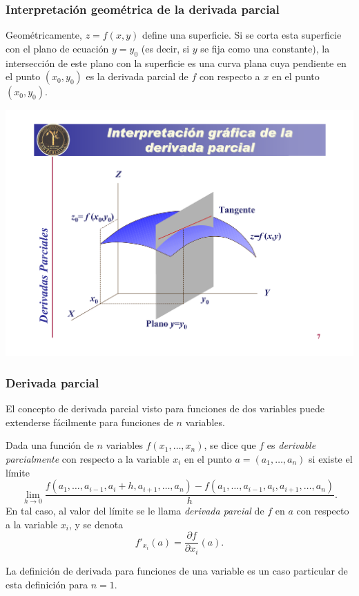 \begin{frame}
\frametitle{Interpretación geométrica de la derivada parcial}
Geométricamente, $z=f(x,y)$ define una superficie. Si se corta esta superficie con el plano de ecuación $y=y_0$ (es
decir, si $y$ se fija como una constante), la intersección de este plano con la superficie es una curva plana cuya
pendiente en el punto $(x_0,y_0)$ es la derivada parcial de $f$ con respecto a $x$ en el punto $(x_0,y_0)$.

\begin{center}
\includegraphics[scale=0.4]{img/tangentesuperficie}
\end{center}
\end{frame}


\begin{frame}
\frametitle{Derivada parcial}
El concepto de derivada parcial visto para funciones de dos variables puede extenderse fácilmente para funciones de $n$
variables.

\begin{definicion}
Dada una función de $n$ variables $f(x_1,\ldots,x_n)$, se dice que $f$ es \emph{derivable parcialmente} con respecto a
la variable $x_i$ en el punto $a=(a_1,\ldots,a_n)$ si existe el límite
\[
\lim_{h\rightarrow 0} \frac{f(a_1,\ldots,a_{i-1},a_i+h,a_{i+1},\ldots,a_n)-f(a_1,\ldots,a_{i-1},a_i,a_{i+1},\ldots,a_n)} {h}.
\]
En tal caso, al valor del límite se le llama \emph{derivada parcial} de $f$ en $a$ con respecto a la variable $x_i$, y
se denota
\[
f'_{x_i}(a)=\frac{\partial f}{\partial x_i}(a).
\]
\end{definicion}
La definición de derivada para funciones de una variable es un caso particular de esta definición para $n=1$.
\end{frame}


